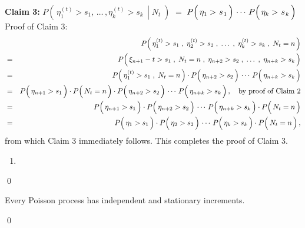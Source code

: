 \vskip 0.5cm
\noindent
\textbf{Claim 3:}\quad
$P\!\left(\,\left.\eta^{(t)}_{1} > s_{1}, \,\ldots\, ,\eta^{(t)}_{k} > s_{k} \,\;\right\vert\; N_{t}\;\right)$\;
$=$
\;$P\!\left(\,\eta_{1} > \overset{{\color{white}-}}{s}_{1}\,\right) \,\cdots\, P\!\left(\,\eta_{k} > \overset{{\color{white}-}}{s}_{k}\,\right)$
\vskip 0.2cm
\noindent
Proof of Claim 3:\quad
\begin{eqnarray*}
&&
	P\!\left(\,\eta^{(t)}_{1} > s_{1} \;,\; \eta^{(t)}_{2} > s_{2} \;,\; \ldots \;,\; \eta^{(t)}_{k} > s_{k} \;,\; N_{t} = n\,\right)
\\
&=&
	P\!\left(\,
		\xi_{n+1} - t \overset{{\color{white}.}}{>} s_{1} \;,\; N_{t} = n \;,\; \eta_{n+2} > s_{2} \;,\; \ldots \;,\; \eta_{n+k} > s_{k}
		\,\right)
\\
&=&
	P\!\left(\,
		\eta^{(t)}_{1} \overset{{\color{white}.}}{>} s_{1} \;,\; N_{t} = n
		\,\right)
	\cdot
	P\!\left(\,
		\eta_{n+2} \overset{{\color{white}.}}{>} s_{2}
		\,\right)
	\,\cdots\,
	P\!\left(\,
		\eta_{n+k} \overset{{\color{white}.}}{>} s_{k}
		\,\right)
\\
&=&
	P\!\left(\,\eta_{n+1} \overset{{\color{white}.}}{>} s_{1}\,\right)
	\cdot
	P\!\left(\,N_{t} \overset{{\color{white}-}}{=} n \,\right)
	\cdot
	P\!\left(\,
		\eta_{n+2} \overset{{\color{white}.}}{>} s_{2}
		\,\right)
	\,\cdots\,
	P\!\left(\,
		\eta_{n+k} \overset{{\color{white}.}}{>} s_{k}
		\,\right),
	\quad
	\textnormal{by proof of Claim 2}
\\
&=&
	P\!\left(\,\eta_{n+1} \overset{{\color{white}.}}{>} s_{1}\,\right)
	\cdot
	P\!\left(\,
		\eta_{n+2} \overset{{\color{white}.}}{>} s_{2}
		\,\right)
	\,\cdots\,
	P\!\left(\,
		\eta_{n+k} \overset{{\color{white}.}}{>} s_{k}
		\,\right)
	\cdot
	P\!\left(\,N_{t} \overset{{\color{white}-}}{=} n \,\right)
\\
&=&
	P\!\left(\,\eta_{1} \overset{{\color{white}.}}{>} s_{1}\,\right)
	\cdot
	P\!\left(\,
		\eta_{2} \overset{{\color{white}.}}{>} s_{2}
		\,\right)
	\,\cdots\,
	P\!\left(\,
		\eta_{k} \overset{{\color{white}.}}{>} s_{k}
		\,\right)
	\cdot
	P\!\left(\,N_{t} \overset{{\color{white}-}}{=} n \,\right),
\end{eqnarray*}
from which Claim 3 immediately follows. This completes the proof of Claim 3.

\begin{enumerate}
\item
\end{enumerate}
\qed


\vskip 0.5cm
\begin{corollary}
\mbox{}
\vskip 0.15cm
\noindent
Every Poisson process has independent and stationary increments.
\end{corollary}
\proof

\qed


\renewcommand{\theenumi}{\roman{enumi}}
\renewcommand{\labelenumi}{\textnormal{(\theenumi)}$\;\;$}

